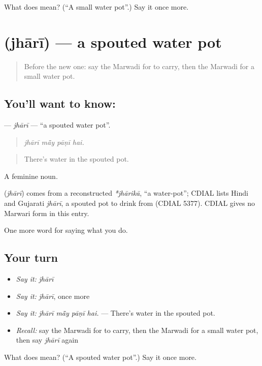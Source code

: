\begin{tcolorbox}[breakable,colback=teal!4,colframe=teal!35!black,title={Before you move on}]
What does  mean? (\textquotedblleft{}A small water pot\textquotedblright{}.) Say it once more.
\end{tcolorbox}
\section[\texorpdfstring{\mw{झारी} (jhārī)}{झारी (jhārī)}]{ (jhārī) — a spouted water pot}

\label{lesson:MW-C175-jhari}



\begin{quote}
Before the new one: say the Marwadi for to carry, then the Marwadi for a small water pot.
\end{quote}

\subsection*{You'll want to know: }
\textbf{} — \emph{jhārī} — \textquotedblleft{}a spouted water pot\textquotedblright{}.

\begin{quote}
   
\end{quote}

\begin{quote}
\emph{jhārī mā̃y pāṇī hai.}
\end{quote}

\begin{quote}
There's water in the spouted pot.
\end{quote}

A feminine noun.

\begin{cousinweb}
\textbf{} (\emph{jhārī}) comes from a reconstructed \emph{*jhārikā}, \textquotedblleft{}a water-pot\textquotedblright{}; CDIAL lists Hindi and Gujarati \emph{jhārī}, a spouted pot to drink from (CDIAL 5377). CDIAL gives no Marwari form in this entry.
\end{cousinweb}

\begin{grammarlens}[title={What you've built}]
One more word for saying what you do.
\end{grammarlens}

\subsection*{Your turn}
\begin{itemize}
\raggedright
  \item \emph{Say it:} \emph{jhārī}
  \item \emph{Say it:} \emph{jhārī}, once more
  \item \emph{Say it:} \emph{jhārī mā̃y pāṇī hai.} — There's water in the spouted pot.
  \item \emph{Recall:} say the Marwadi for to carry, then the Marwadi for a small water pot, then say \emph{jhārī} again
\end{itemize}

\begin{tcolorbox}[breakable,colback=teal!4,colframe=teal!35!black,title={Before you move on}]
What does  mean? (\textquotedblleft{}A spouted water pot\textquotedblright{}.) Say it once more.
\end{tcolorbox}
